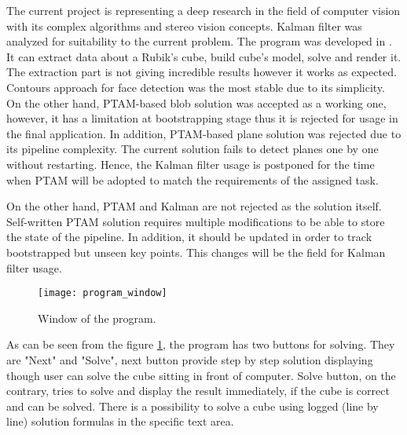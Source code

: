 \documentclass[../main.tex]{subfiles}
\begin{document}
The current project is representing a deep research in the field of computer vision with its complex algorithms and stereo vision concepts. Kalman filter was analyzed for suitability to the current problem. The program was developed in {\Csharp}. It can extract data about a Rubik's cube, build cube's model, solve and render it. The extraction part is not giving incredible results however it works as expected. Contours approach for face detection was the most stable due to its simplicity. On the other hand, \ac{PTAM}-based blob solution was accepted as a working one, however, it has a limitation at bootstrapping stage thus it is rejected for usage in the final application. In addition, \ac{PTAM}-based plane solution was rejected due to its pipeline complexity. The current solution fails to detect planes one by one without restarting. Hence, the Kalman filter usage is postponed for the time when \ac{PTAM} will be adopted to match the requirements of the assigned task.

On the other hand, \ac{PTAM} and Kalman are not rejected as the solution itself. Self-written \ac{PTAM} solution requires multiple modifications to be able to store the state of the pipeline. In addition, it should be updated in order to track bootstrapped but unseen key points. This changes will be the field for Kalman filter usage.

\begin{figure} [ht!]
    \begin{center}
        \texttt{[image: program\_window]}
        \caption{Window of the program.}
        \label{fig:framework_program_window}
    \end{center}
\end{figure}

As can be seen from the figure \ref{fig:framework_program_window}, the program has two buttons for solving. They are "Next" and "Solve", next button provide step by step solution displaying though user can solve the cube sitting in front of computer. Solve button, on the contrary, tries to solve and display the result immediately, if the cube is correct and can be solved. There is a possibility to solve a cube using logged (line by line) solution formulas in the specific text area.
\end{document}
